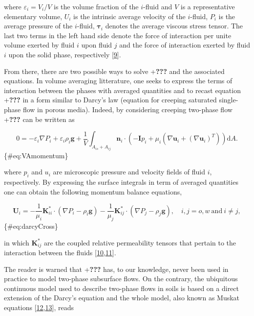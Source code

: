 \documentclass[]{article}
\begin{document}
where \(\varepsilon_{i}=V_i/V\) is the volume fraction of the
\(i\)-fluid and \(V\) is a representative elementary volume, \(U_i\) is
the intrinsic average velocity of the \(i\)-fluid, \(P_i\) is the
average pressure of the \(i\)-fluid, \(\boldsymbol{\tau}_{i}\) denotes
the average viscous stress tensor. The last two terms in the left hand
side denote the force of interaction per unite volume exerted by fluid
\(i\) upon fluid \(j\) and the force of interaction exerted by fluid
\(i\) upon the solid phase, respectively
{[}\protect\hyperlink{ref-Kalaydjian1987}{9}{]}.

From there, there are two possible ways to solve +\textbf{???} and the
associated equations. In volume averaging litterature, one seeks to
express the terms of interaction between the phases with averaged
quantities and to recast equation +\textbf{???} in a form similar to
Darcy's law (equation for creeping saturated single-phase flow in porous
media). Indeed, by considering creeping two-phase flow +\textbf{???} can
be written as

\[
0=-\varepsilon_{i}\nabla P_{i}+\varepsilon_{i}\rho_{i}\mathbf{g}+\frac{1}{V}\int_{A_{is}+A_{ij}}\mathbf{n}_{i}\cdot\left(-\mathbf{I}p_{i}+\mu_{i}\left(\nabla\mathbf{u}_{i}+\left(\nabla\mathbf{u}_{i}\right)^{T}\right)\right)\mathrm{d}A.
\] \{\#eq:VAmomentum\}

where \(p_i\) and \(u_i\) are microscopic pressure and velocity fields
of fluid \(i\), respectively. By expressing the surface integrals in
term of averaged quantities one can obtain the following momentum
balance equations,

\[
\mathbf{U}_{i}=-\frac{1}{\mu_{i}}\mathbf{K}_{ii}^{*}\cdot(\nabla P_{i}-\rho_{i}\mathbf{g})-\frac{1}{\mu_{j}}\mathbf{K}_{ij}^{*}\cdot(\nabla P_{j}-\rho_{j}\mathbf{g}),\quad i,j=o,w\:\mathrm{and}\:i\neq j,
\] \{\#eq:darcyCross\}

in which \(\mathbf{K}_{ij}^{*}\) are the coupled relative permeability
tensors that pertain to the interaction between the fluids
{[}\protect\hyperlink{ref-Whitaker1986a}{10},\protect\hyperlink{ref-Lasseux1996}{11}{]}.

The reader is warned that +\textbf{???} has, to our knowledge, never
been used in practice to model two-phase subsurface flows. On the
contrary, the ubiquitous continuous model used to describe two-phase
flows in soils is based on a direct extension of the Darcy's equation
and the whole model, also known as Muskat equations
{[}\protect\hyperlink{ref-wyckoff1936flow}{12},\protect\hyperlink{ref-muskat1938flow}{13}{]},
reads
\end{document}
